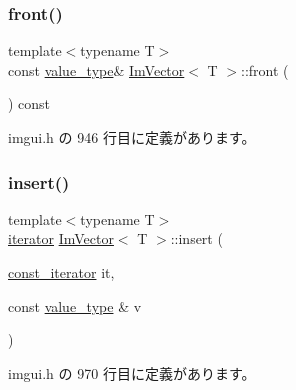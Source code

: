 \subsubsection{\texorpdfstring{front()}{front()}\hspace{0.1cm}{\footnotesize\ttfamily [2/2]}}
{\footnotesize\ttfamily template$<$typename T$>$ \\
const \mbox{\hyperlink{class_im_vector_a8bd77e4e7581d8e5f9e98d7c2f3c2a80}{value\+\_\+type}}\& \mbox{\hyperlink{class_im_vector}{Im\+Vector}}$<$ T $>$\+::front (\begin{DoxyParamCaption}{ }\end{DoxyParamCaption}) const\hspace{0.3cm}{\ttfamily [inline]}}



 imgui.\+h の 946 行目に定義があります。

\mbox{\label{class_im_vector_a52fdb731c13c82a1fd971186c6a701b5}} 
\subsubsection{\texorpdfstring{insert()}{insert()}}
{\footnotesize\ttfamily template$<$typename T$>$ \\
\mbox{\hyperlink{class_im_vector_a74b5478f1f6fd471cc71219bce483db6}{iterator}} \mbox{\hyperlink{class_im_vector}{Im\+Vector}}$<$ T $>$\+::insert (\begin{DoxyParamCaption}\item[{\mbox{\hyperlink{class_im_vector_aedeac9c5080f9d6ce96ae837768ee4c4}{const\+\_\+iterator}}}]{it,  }\item[{const \mbox{\hyperlink{class_im_vector_a8bd77e4e7581d8e5f9e98d7c2f3c2a80}{value\+\_\+type}} \&}]{v }\end{DoxyParamCaption})\hspace{0.3cm}{\ttfamily [inline]}}



 imgui.\+h の 970 行目に定義があります。

\mbox{\label{class_im_vector_a59a3eeadda07579727de93ca6844b91e}} 
